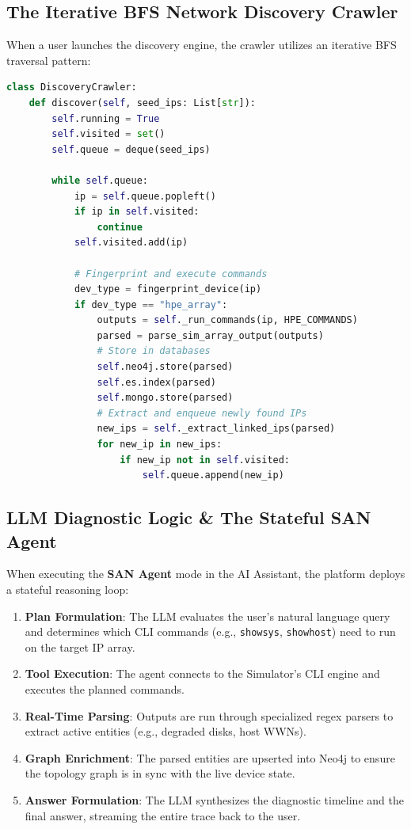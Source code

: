 \documentclass[11pt,a4paper]{article}
\begin{document}
\subsection{The Iterative BFS Network Discovery Crawler}
When a user launches the discovery engine, the crawler utilizes an iterative BFS traversal pattern:
\begin{lstlisting}[language=Python, caption=Discovery BFS Core Pipeline]
class DiscoveryCrawler:
    def discover(self, seed_ips: List[str]):
        self.running = True
        self.visited = set()
        self.queue = deque(seed_ips)
        
        while self.queue:
            ip = self.queue.popleft()
            if ip in self.visited:
                continue
            self.visited.add(ip)
            
            # Fingerprint and execute commands
            dev_type = fingerprint_device(ip)
            if dev_type == "hpe_array":
                outputs = self._run_commands(ip, HPE_COMMANDS)
                parsed = parse_sim_array_output(outputs)
                # Store in databases
                self.neo4j.store(parsed)
                self.es.index(parsed)
                self.mongo.store(parsed)
                # Extract and enqueue newly found IPs
                new_ips = self._extract_linked_ips(parsed)
                for new_ip in new_ips:
                    if new_ip not in self.visited:
                        self.queue.append(new_ip)
\end{lstlisting}

\subsection{LLM Diagnostic Logic \& The Stateful SAN Agent}
When executing the \textbf{SAN Agent} mode in the AI Assistant, the platform deploys a stateful reasoning loop:
\begin{enumerate}
    \item \textbf{Plan Formulation}: The LLM evaluates the user's natural language query and determines which CLI commands (e.g., \texttt{showsys}, \texttt{showhost}) need to run on the target IP array.
    \item \textbf{Tool Execution}: The agent connects to the Simulator's CLI engine and executes the planned commands.
    \item \textbf{Real-Time Parsing}: Outputs are run through specialized regex parsers to extract active entities (e.g., degraded disks, host WWNs).
    \item \textbf{Graph Enrichment}: The parsed entities are upserted into Neo4j to ensure the topology graph is in sync with the live device state.
    \item \textbf{Answer Formulation}: The LLM synthesizes the diagnostic timeline and the final answer, streaming the entire trace back to the user.
\end{enumerate}
\end{document}
